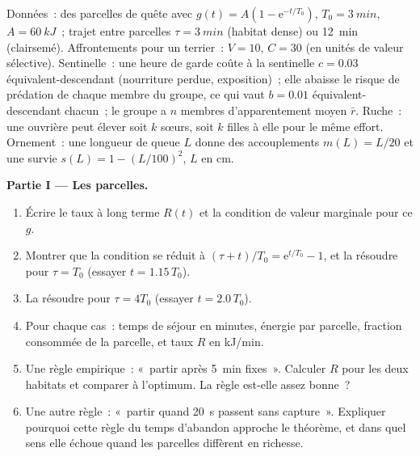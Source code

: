 \begin{problem}
\label{pb:b3:behavioural-ecology:1}
Données~: des parcelles de quête avec $g(t) = A(1 - \mathrm{e}^{-t/T_{0}})$, $T_{0}
= \qty{3}{min}$, $A = \qty{60}{kJ}$~; trajet entre parcelles $\tau =
\qty{3}{min}$ (habitat dense) ou \qty{12}{min} (clairsemé).
Affrontements pour un terrier~: $V = 10$, $C = 30$ (en unités de valeur
sélective). Sentinelle~: une heure de garde coûte à la sentinelle
$c = 0.03$ équivalent-descendant (nourriture perdue, exposition)~; elle
abaisse le risque de prédation de chaque membre du groupe, ce qui vaut
$b = 0.01$ équivalent-descendant chacun~; le groupe a $n$ membres
d'apparentement moyen $\bar r$. Ruche~: une ouvrière peut élever soit $k$
sœurs, soit $k$ filles à elle pour le même effort. Ornement~: une
longueur de queue $L$ donne des accouplements $m(L) = L/20$ et une
survie $s(L) = 1 - (L/100)^{2}$, $L$ en cm.

\medskip
\noindent\textbf{Partie I --- Les parcelles.}
\begin{enumerate}
  \item Écrire le taux à long terme $R(t)$ et la condition de valeur
        marginale pour ce $g$.
  \item Montrer que la condition se réduit à $(\tau + t)/T_{0} = \mathrm{e}^{t/T_{0}}
        - 1$, et la résoudre pour $\tau = T_{0}$ (essayer $t = 1.15\,T_{0}$).
  \item La résoudre pour $\tau = 4T_{0}$ (essayer $t = 2.0\,T_{0}$).
  \item Pour chaque cas~: temps de séjour en minutes, énergie par
        parcelle, fraction consommée de la parcelle, et taux $R$ en
        kJ/min.
  \item Une règle empirique~: «~partir après \qty{5}{min} fixes~».
        Calculer $R$ pour les deux habitats et comparer à l'optimum. La
        règle est-elle assez bonne~?
  \item Une autre règle~: «~partir quand \qty{20}{s} passent sans
        capture~». Expliquer pourquoi cette règle du temps d'abandon
        approche le théorème, et dans quel sens elle échoue quand les
        parcelles diffèrent en richesse.
\end{enumerate}


\end{problem}
